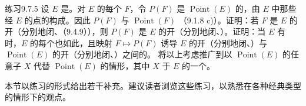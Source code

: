 \begin{SGAresult}{练习}{9.7.5}
设 $E$ 是。对 $E$ 的每个 $F$，令 $P(F)$ 是 $\operatorname{Point}(E)$ 的，由 $E$ 中那些经 $E$ 的点的构成。因此 $P(F)$ 与 $\operatorname{Point}(F)$ （9.1.8 c)）。证明：若 $F$ 是 $E$ 的开（分别地闭、（9.4.9）），则 $P(F)$ 是 $E$ 的开（分别地闭、）。证明：当 $E$ 有时，$E$ 的每个也如此，且映射 $F\mapsto P(F)$ 诱导 $E$ 的开（分别地闭、）与 $\operatorname{Point}(E)$ 的开（分别地闭、）之间的。
将以上考虑推广到以 $\operatorname{Point}(E)$ 的任意子 $X$ 代替 $\operatorname{Point}(E)$ 的情形，其中 $X$ 于 $E$ 的一个。
\end{SGAresult}
本节以练习的形式给出若干补充。建议读者浏览这些练习，以熟悉在各种经典类型的情形下的观点。
